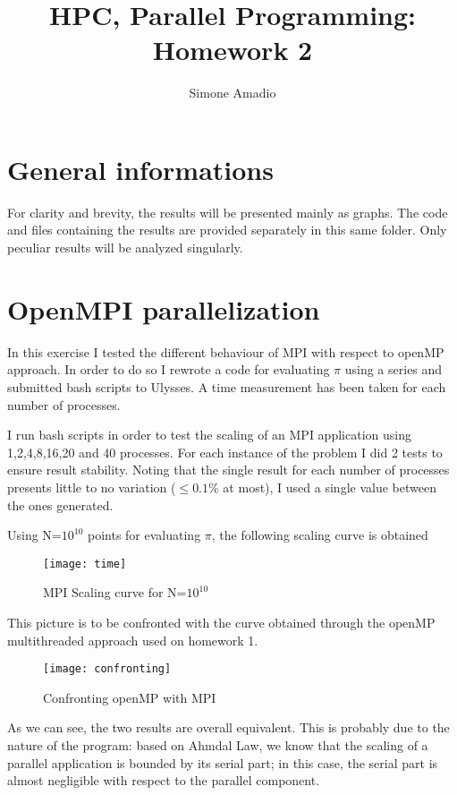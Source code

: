 \documentclass[10pt,a4paper]{article}
\begin{document}
\author{Simone Amadio}
\title{HPC, Parallel Programming:\\Homework 2}
\date{}
\maketitle

\section*{General informations}

For clarity and brevity, the results will be presented mainly as graphs. The code and files containing the results are provided separately in this same folder. Only peculiar results will be analyzed singularly.

\section{OpenMPI parallelization}
In this exercise I tested the different behaviour of MPI with respect to openMP approach. In order to do so I rewrote a code for evaluating $\pi$ using a series and submitted bash scripts to Ulysses. A time measurement has been taken for each number of processes.

I run bash scripts in order to test the scaling of an MPI application using 1,2,4,8,16,20 and 40 processes. For each instance of the problem I did 2 tests to ensure result stability. Noting that the single result for each number of processes presents little to no variation ($\leq 0.1\%$ at most), I used a single value between the ones generated.

Using N=$10^{10}$ points for evaluating $\pi$, the following scaling curve is obtained

\begin{figure}[h!]
	\centering
	\texttt{[image: time]}
	\caption*{MPI Scaling curve for N=$10^{10}$}
	\label{fig:time}
\end{figure}

This picture is to be confronted with the curve obtained through the openMP multithreaded approach used on homework 1.

\begin{figure}
	\centering
	\texttt{[image: confronting]}
	\caption*{Confronting openMP with MPI}
	\label{fig:confronting}
\end{figure}

As we can see, the two results are overall equivalent. This is probably due to the nature of the program: based on Ahmdal Law, we know that the scaling of a parallel application is bounded by its serial part; in this case, the serial part is almost negligible with respect to the parallel component.
\end{document}
